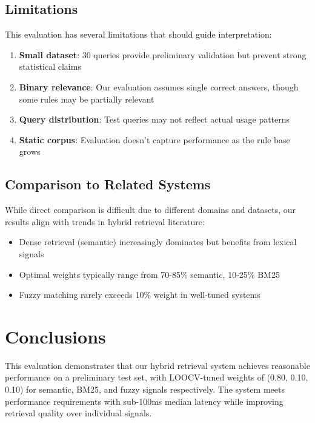 \subsection{Limitations}

This evaluation has several limitations that should guide interpretation:

\begin{enumerate}[leftmargin=*,itemsep=2pt,topsep=2pt]
  \item \textbf{Small dataset}: 30 queries provide preliminary validation but prevent strong statistical claims
  \item \textbf{Binary relevance}: Our evaluation assumes single correct answers, though some rules may be partially relevant
  \item \textbf{Query distribution}: Test queries may not reflect actual usage patterns
  \item \textbf{Static corpus}: Evaluation doesn't capture performance as the rule base grows
\end{enumerate}

\subsection{Comparison to Related Systems}

While direct comparison is difficult due to different domains and datasets, our results align with trends in hybrid retrieval literature:

\begin{itemize}[leftmargin=*,itemsep=2pt,topsep=2pt]
  \item Dense retrieval (semantic) increasingly dominates but benefits from lexical signals
  \item Optimal weights typically range from 70-85\% semantic, 10-25\% BM25
  \item Fuzzy matching rarely exceeds 10\% weight in well-tuned systems
\end{itemize}

\section{Conclusions}
\label{sec:evaluation-conclusions}

This evaluation demonstrates that our hybrid retrieval system achieves reasonable performance on a preliminary test set, with LOOCV-tuned weights of (0.80, 0.10, 0.10) for semantic, BM25, and fuzzy signals respectively. The system meets performance requirements with sub-100ms median latency while improving retrieval quality over individual signals.

